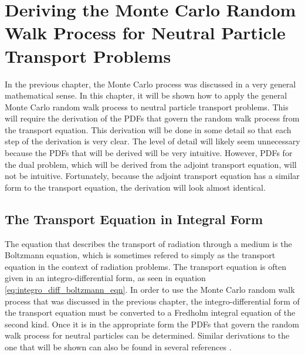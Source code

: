 \chapter{Deriving the Monte Carlo Random Walk Process for Neutral Particle Transport Problems}
\label{ch:neutral_particle_transport}
In the previous chapter, the Monte Carlo process was discussed in a very
general mathematical sense. In this chapter, it will be shown how to apply
the general Monte Carlo random walk process to neutral particle transport 
problems. This will require the derivation of the PDFs that govern the random 
walk process from the transport equation. This derivation will be done in
some detail so that each step of the derivation is very clear. The level of
detail will likely seem unnecessary because the PDFs that will be derived
will be very intuitive. However, PDFs for the dual problem, which will be
derived from the adjoint transport equation, will not be intuitive. 
Fortunately, because the adjoint transport equation has a similar form to the
transport equation, the derivation will look almost identical. 

\section{The Transport Equation in Integral Form}
\label{sec:transport_eqn_integral_form}
The equation that describes the transport of radiation through a medium is
the Boltzmann equation, which is sometimes refered to simply as the transport
equation in the context of radiation problems. The transport equation is often
given in an integro-differential form, as seen in equation 
\ref{eq:integro_diff_boltzmann_eqn}. In order to use the Monte Carlo random
walk process that was discussed in the previous chapter, the 
integro-differential form of the transport equation must be converted to a 
Fredholm integral equation of the second kind. Once it is in the appropriate
form the PDFs that govern the random walk process for neutral particles can be 
determined. Similar derivations to the one that will be shown can also
be found in several references \citep{lewis, hoogenboom, irving}.
 
